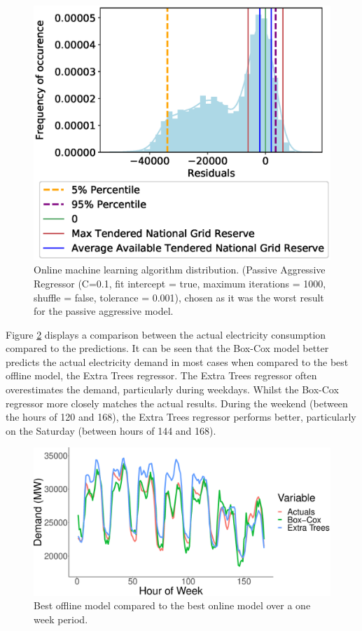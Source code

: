 \begin{figure}[h]
\centering
\includegraphics[width=\columnwidth]{Chapter5/figures/market-forecasting/results/online_learning_dists-C-0.1-fit_intercept-true-max_iter-1000-shuffle-false-tol-001.eps}
\caption{Online machine learning algorithm distribution. (Passive Aggressive Regressor (C=0.1, fit intercept = true, maximum iterations = 1000, shuffle = false, tolerance = 0.001), chosen as it was the worst result for the passive aggressive model.}
\label{fig:bad_online_learning_day_distribution}
\end{figure}


Figure \ref{fig:both_actual_predicted} displays a comparison between the actual electricity consumption compared to the predictions. It can be seen that the Box-Cox model better predicts the actual electricity demand in most cases when compared to the best offline model, the Extra Trees regressor. The Extra Trees regressor often overestimates the demand, particularly during weekdays. Whilst the Box-Cox regressor more closely matches the actual results. During the weekend (between the hours of 120 and 168), the Extra Trees regressor performs better, particularly on the Saturday (between hours of 144 and 168). 


\begin{figure}[h]
\centering
\includegraphics[width=\columnwidth]{Chapter5/figures/market-forecasting/results/both_actual_predicted.eps}
\caption{Best offline model compared to the best online model over a one week period.}
\label{fig:both_actual_predicted}
\end{figure}

